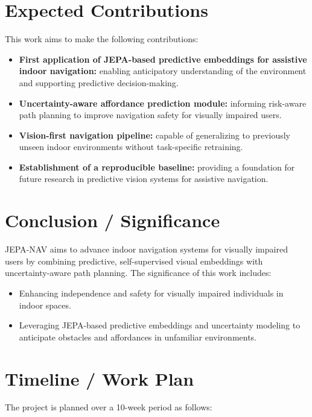 \documentclass{article}
\begin{document}
\section{Expected Contributions}

This work aims to make the following contributions:

\begin{itemize}
    \item \textbf{First application of JEPA-based predictive embeddings for assistive indoor navigation:} enabling anticipatory understanding of the environment and supporting predictive decision-making.
    \item \textbf{Uncertainty-aware affordance prediction module:} informing risk-aware path planning to improve navigation safety for visually impaired users.
    \item \textbf{Vision-first navigation pipeline:} capable of generalizing to previously unseen indoor environments without task-specific retraining.
    \item \textbf{Establishment of a reproducible baseline:} providing a foundation for future research in predictive vision systems for assistive navigation.
\end{itemize}

\section{Conclusion / Significance}

JEPA‑NAV aims to advance indoor navigation systems for visually impaired users by combining predictive, self-supervised visual embeddings with uncertainty-aware path planning. The significance of this work includes:

\begin{itemize}
    \item Enhancing independence and safety for visually impaired individuals in indoor spaces.
    \item Leveraging JEPA-based predictive embeddings and uncertainty modeling to anticipate obstacles and affordances in unfamiliar environments.
\end{itemize}

\section{Timeline / Work Plan}

The project is planned over a 10-week period as follows:
\end{document}
